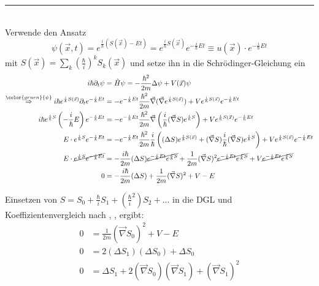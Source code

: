 \documentclass{article}
\newcommand{\lr}[1]{\left(#1\right)}
\newcommand{\comment}[1]{{\color{gruen} {#1}}}
\begin{document}
{\color{violet}
\hrule
	\\
	Verwende den Ansatz
		$$\psi(\vec{x},t) = e^{\frac{i}{\hbar}(S(\vec{x}) - E t )} = e^{\frac{i}{\hbar}S(\vec{x})} e^{-\frac{i}{\hbar}Et} \equiv u(\vec{x})\cdot e^{-\frac{i}{\hbar}Et}$$
	mit $S(\vec{x}) = \sum_k \lr{\frac{\hbar}{i}}^k S_k(\vec{x})$ und setze ihn in die Schrödinger-Gleichung ein
		\begin{align*}			
			i\hbar \partial_t \psi &= \hat{H}\psi = -\frac{\hbar^2}{2m}\Delta\psi + V(\vec{x})\psi \\
			\stackrel{\comment{\psi}}{\Rightarrow} i\hbar e^{\frac{i}{\hbar}S(\vec{x})} \partial_t e^{-\frac{i}{\hbar}Et} &= -e^{-\frac{i}{\hbar}Et} \frac{\hbar^2}{2m} \vec{\nabla} (\vec{\nabla} e^{\frac{i}{\hbar}S(\vec{x})}) + V e^{\frac{i}{\hbar}S(\vec{x})} e^{-\frac{i}{\hbar}Et} \\
			i\hbar e^{\frac{i}{\hbar}S} \lr{-\frac{i}{\hbar}E} e^{-\frac{i}{\hbar}Et} &= -e^{-\frac{i}{\hbar}Et} \frac{\hbar^2}{2m} \vec{\nabla}\lr{ \frac{i}{\hbar} (\vec{\nabla} S) e^{\frac{i}{\hbar}S} } + V e^{\frac{i}{\hbar}S(\vec{x})} e^{-\frac{i}{\hbar}Et} \\
			E \cdot e^{\frac{i}{\hbar}S} e^{-\frac{i}{\hbar}Et} &= -e^{-\frac{i}{\hbar}Et} \frac{\hbar^2}{2m} \frac{i}{\hbar} \lr{  (\Delta S) e^{\frac{i}{\hbar}S(\vec{x})} + (\vec{\nabla}S) \frac{i}{\hbar} (\vec{\nabla}S) e^{\frac{i}{\hbar}S} } + V e^{\frac{i}{\hbar}S(\vec{x})} e^{-\frac{i}{\hbar}Et} \\
			E \cdot \cancel{ e^{\frac{i}{\hbar}S} e^{-\frac{i}{\hbar}Et} } &= -\frac{i\hbar}{2m} (\Delta S) \cancel{ e^{-\frac{i}{\hbar}Et}e^{\frac{i}{\hbar}S} } + \frac{1}{2m}(\vec{\nabla}S)^2 \cancel{ e^{-\frac{i}{\hbar}Et} e^{\frac{i}{\hbar}S} } + V \cancel{ e^{-\frac{i}{\hbar}Et} e^{\frac{i}{\hbar}S} } \\
			0 &= -\frac{i\hbar}{2m}(\Delta S) + \frac{1}{2m}(\vec{\nabla}S)^2 + V - E
		\end{align*}
		
Einsetzen von $S = S_0 + \frac{\hbar}{i}S_1 + \lr{\frac{\hbar}{i}^2}S_2 + ...$ in die DGL und Koeffizientenvergleich nach , ,  ergibt:
		\begin{align*}
			0 &= \frac{1}{2m}(\vec{\nabla}S_0)^2 + V - E \\
			0 &= 2(\Delta S_1)(\Delta S_0) + \Delta S_0 \\
			0 &= \Delta S_1 + 2(\vec{\nabla}S_0)(\vec{\nabla}S_1) + (\vec{\nabla}S_1)^2
		\end{align*}

}
\end{document}
